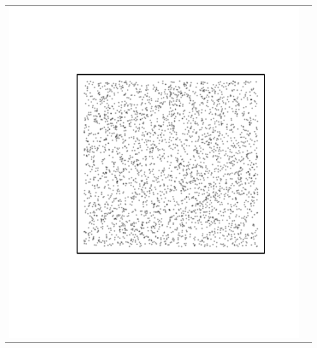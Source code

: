 \documentclass{article}\usepackage{graphicx, color}
\makeatletter
\def\maxwidth{ %
  \ifdim\Gin@nat@width>\linewidth
    \linewidth
  \else
    \Gin@nat@width
  \fi
}
\newenvironment{knitrout}{}{} %
\makeatother
\begin{document}
\vspace*{-1.75in}
\begin{tabular}{cc}
\begin{knitrout}
\definecolor{shadecolor}{rgb}{0.969, 0.969, 0.969}\color{fgcolor}\includegraphics[width=\maxwidth]{figure/unnamed-chunk-15} 
\end{knitrout}


\end{tabular}
\end{document}
